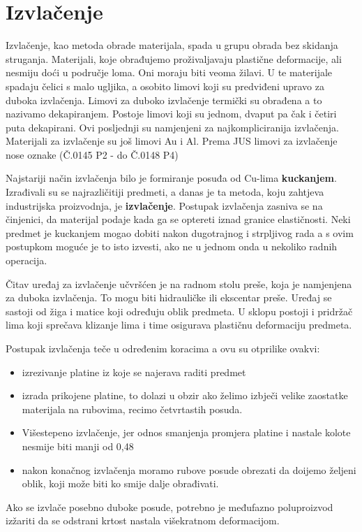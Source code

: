 \documentclass[a4paper,12pt]{article}
\numberwithin{figure}{section}
\begin{document}
\section{Izvlačenje}
Izvlačenje, kao metoda obrade materijala, spada u grupu obrada bez skidanja struganja. Materijali, koje obrađujemo proživaljavaju plastične deformacije, ali nesmiju doći u područje loma. Oni moraju biti veoma žilavi. U te materijale spadaju čelici s malo ugljika, a osobito limovi koji su  predviđeni upravo za duboka izvlačenja. Limovi za duboko izvlačenje termički su obrađena a to nazivamo dekapiranjem. Postoje limovi koji su jednom, dvaput pa čak i četiri puta dekapirani. Ovi posljednji su namjenjeni za najkompliciranija izvlačenja. Materijali za izvlačenje su još limovi Au i Al. Prema JUS limovi za izvlačenje nose oznake (Č.0145 P2 - do Č.0148 P4)\par  
Najstariji način izvlačenja bilo je formiranje posuđa od Cu-lima \textbf{kuckanjem}. Izrađivali su se najrazličitiji predmeti, a danas je ta metoda, koju zahtjeva industrijska proizvodnja, je \textbf{izvlačenje}. Postupak izvlačenja zasniva se na činjenici, da materijal podaje kada ga se optereti iznad granice elastičnosti. Neki predmet je kuckanjem mogao dobiti nakon dugotrajnog i strpljivog rada a s ovim postupkom moguće je to isto izvesti, ako ne u jednom onda u nekoliko radnih operacija. \par
Čitav uređaj za izvlačenje učvršćen je na radnom stolu preše, koja je namjenjena za duboka izvlačenja. To mogu biti hidrauličke ili ekscentar preše. Uređaj se sastoji od žiga i matice koji određuju oblik predmeta. U sklopu postoji i pridržač lima koji sprečava klizanje lima i time osigurava plastičnu deformaciju predmeta. \par
Postupak izvlačenja teče u određenim koracima a ovu su otprilike ovakvi:
\begin{itemize}
\item izrezivanje platine iz koje se najerava raditi predmet
\item izrada prikojene platine, to dolazi u obzir ako želimo izbječi velike zaostatke materijala na rubovima, recimo četvrtastih posuda. 
\item Višestepeno izvlačenje, jer odnos smanjenja promjera platine i nastale kolote nesmije biti manji od 0,48
\item nakon konačnog izvlačenja moramo rubove posude obrezati da doijemo željeni oblik, koji može biti ko smije dalje obrađivati.
\end{itemize}
Ako se izvlače posebno duboke posude, potrebno je međufazno poluproizvod izžariti da se odstrani krtost nastala višekratnom deformacijom.\par
\end{document}
